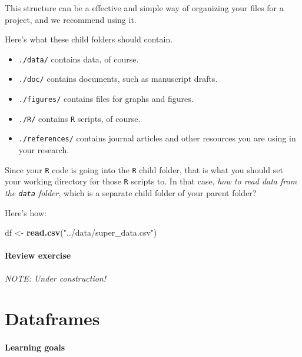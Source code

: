 \documentclass[
]{book}
\newenvironment{Shaded}{\begin{snugshade}}{\end{snugshade}}
\newcommand{\KeywordTok}[1]{\textcolor[rgb]{0.13,0.29,0.53}{\textbf{#1}}}
\newcommand{\NormalTok}[1]{#1}
\newcommand{\StringTok}[1]{\textcolor[rgb]{0.31,0.60,0.02}{#1}}
\providecommand{\tightlist}{%
  \setlength{\itemsep}{0pt}\setlength{\parskip}{0pt}}
\begin{document}
This structure can be a effective and simple way of organizing your files for a project, and we recommend using it.

Here's what these child folders should contain.

\begin{itemize}
\tightlist
\item
  \texttt{./data/} contains data, of course.
\item
  \texttt{./doc/} contains documents, such as manuscript drafts.
\item
  \texttt{./figures/} contains files for graphs and figures.
\item
  \texttt{./R/} contains \texttt{R} scripts, of course.
\item
  \texttt{./references/} contains journal articles and other resources you are using in your research.
\end{itemize}

Since your \texttt{R} code is going into the \texttt{R} child folder, that is what you should set your working directory for those \texttt{R} scripts to. In that case, \emph{how to read data from the \texttt{data} folder}, which is a separate child folder of your parent folder?

Here's how:

\begin{Shaded}
\begin{Highlighting}[]
\NormalTok{df <-}\StringTok{ }\KeywordTok{read.csv}\NormalTok{(}\StringTok{"../data/super_data.csv"}\NormalTok{)}
\end{Highlighting}
\end{Shaded}

\hypertarget{review-exercise}{%
\subsubsection*{Review exercise}\label{review-exercise}}

\emph{NOTE: Under construction!}

\hypertarget{dataframes}{%
\chapter{Dataframes}\label{dataframes}}

\hypertarget{learning-goals-9}{%
\subsubsection*{Learning goals}\label{learning-goals-9}}
\end{document}
